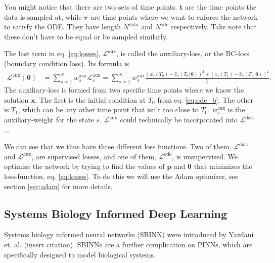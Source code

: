 You might notice that there are two sets of time points. 
$\mathbf{t}$ are the time points the data is sampled at, while $\mathbf{\tau}$ are time points where we want to enforce the network to satisfy the ODE. %
They have length $N^{\text{data}}$ and $N^{\text{ode}}$ respectively. Take note that these don't have to be equal or be sampled similarly.



The last term in eq. \ref{eq:losses}, $\mathcal{L}^{ \text{aux}}$, is called the auxiliary-loss, or the BC-loss (boundary condition loss). 
Its formula is
\begin{align}
	\mathcal{L}^{ \text{aux} }(\boldsymbol{\theta}) &= \sum_{s=1}^{S} w_{s}^{ \text{aux} } \mathcal{L}_{s}^{ \text{aux} } = \sum_{s=1}^{S} w_{s}^{\text{aux}} \frac{ \left(x_{s} \left( T_{0} \right) - \hat{x}_{s} \left(T_{0} ; \boldsymbol{\theta} \right) \right)^{2} + \left(x_{s} \left(T_{1}\right) - \hat{x}_{s} \left(T_{1} ; \boldsymbol{\theta} \right) \right)^{2}}{2}.
\end{align}
The auxiliary-loss is formed from two specific time points where we know the solution $\mathbf{x}$. 
The first is the initial condition at $T_0$ from eq. \ref{eq:ode_b}. The other is $T_1$, which can be any other time point that isn't too close to $T_0$. 
$w_{s}^{\text{aux}}$ is the auxiliary-weight for the state $s$.
$\mathcal{L}^{ \text{aux}}$ could technically be incorporated into $\mathcal{L}^{\text {data}}$... %


We can see that we thus have three different loss functions. Two of them, $\mathcal{L}^{\text {data}}$ and $\mathcal{L}^{ \text{aux}}$, are supervised losses, and one of them, $\mathcal{L}^{\text {ode}}$, is unsupervised. We optimize the network by trying to find the values of $\mathbf{p}$ and $\mathbf{\theta}$ that minimizes the loss-function, eq. \ref{eq:losses}. To do this we will use the Adam optimizer, see section \ref{sec:adam} for more details.



\subsection{Systems Biology Informed Deep Learning}

Systems biology informed neural networks (SBINN) were introduced by Yazdani et. al. (insert citation).
SBINNs are a further complication on PINNs, which are specifically designed to model biological systems. 

